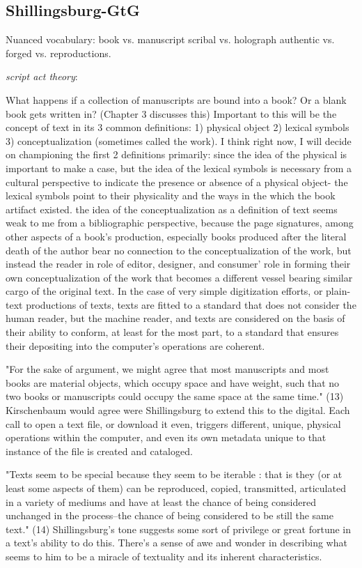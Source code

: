 \documentclass[course, english]{Notes}
\begin{document}
		

\subsection{Shillingsburg-GtG}
Nuanced vocabulary:
book vs. manuscript
scribal vs. holograph
authentic vs. forged vs. reproductions.

\emph{script act theory}: 

What happens if a collection of manuscripts are bound into a book? Or a blank book gets written in? (Chapter 3 discusses this)
	 {Important to this will be the concept of text in its 3 common definitions: 1) physical object 2) lexical symbols 3) conceptualization (sometimes called the work).}
	 {I think right now, I will decide on championing the first 2 definitions primarily: since the idea of the physical is important to make a case, but the idea of the lexical symbols is necessary from a cultural perspective to indicate the presence or absence of a physical object- the lexical symbols point to their physicality and the ways in the which the book artifact existed.}
	 {the idea of the conceptualization as a definition of text seems weak to me from a bibliographic perspective, because the page signatures, among other aspects of a book's production, especially books produced after the literal death of the author bear no connection to the conceptualization of the work, but instead the reader in role of editor, designer, and consumer' role in forming their own conceptualization of the work that becomes a different vessel bearing similar cargo of the original text.}
	 {In the case of very simple digitization efforts, or plain-text productions of texts, texts are fitted to a standard that does not consider the human reader, but the machine reader, and texts are considered on the basis of their ability to conform, at least for the most part, to a standard that ensures their depositing into the computer's operations are coherent.}
	
"For the sake of argument, we might agree that most manuscripts and most books are material objects, which occupy space and have weight, such that no two books or manuscripts could occupy the same space at the same time." (13)
	 {Kirschenbaum would agree were Shillingsburg to extend this to the digital. Each call to open a text file, or download it even, triggers different, unique, physical operations within the computer, and even its own metadata unique to that instance of the file is created and cataloged.}

"Texts seem to be special because they seem to be iterable : that is they (or at least some aspects of them) can be reproduced, copied, transmitted, articulated in a variety of mediums and have at least the chance of being considered unchanged in the process--the chance of being considered to be still the same text." (14)
	 {Shillingsburg's tone suggests some sort of privilege or great fortune in a text's ability to do this. There's a sense of awe and wonder in describing what seems to him to be a miracle of textuality and its inherent characteristics.}
\end{document}
